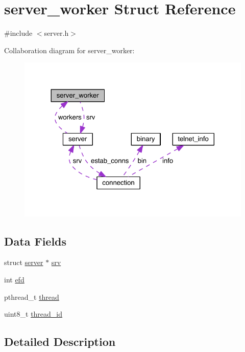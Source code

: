 \hypertarget{structserver__worker}{}\section{server\+\_\+worker Struct Reference}
\label{structserver__worker}


{\ttfamily \#include $<$server.\+h$>$}



Collaboration diagram for server\+\_\+worker\+:
\nopagebreak
\begin{figure}[H]
\begin{center}
\leavevmode
\includegraphics[width=324pt]{structserver__worker__coll__graph}
\end{center}
\end{figure}
\subsection*{Data Fields}
\begin{DoxyCompactItemize}
\item 
struct \hyperlink{structserver}{server} $\ast$ \hyperlink{structserver__worker_a1b6916fd6bd625513f86cc35333623c9}{srv}
\item 
int \hyperlink{structserver__worker_a1b04761ab401c558633d47581715bcf3}{efd}
\item 
pthread\+\_\+t \hyperlink{structserver__worker_a01f75a9ad916f63a94e06a27635ba278}{thread}
\item 
uint8\+\_\+t \hyperlink{structserver__worker_a2a8bb64b8b47a31561ece0650b3cdc6e}{thread\+\_\+id}
\end{DoxyCompactItemize}


\subsection{Detailed Description}


